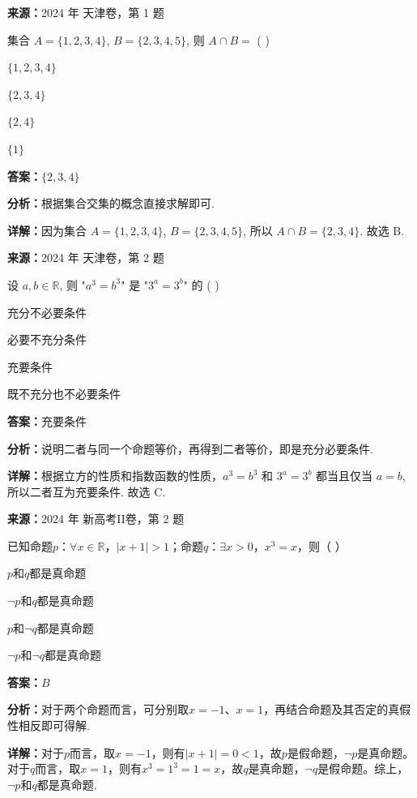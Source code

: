 \begin{question}[points=5]
\textbf{来源：}2024 年 天津卷，第 1 题\par
集合 $A = \{1,2,3,4\}$, $B = \{2,3,4,5\}$, 则 $A \cap B =$ ( )
\begin{choices}
  \item $\{1,2,3,4\}$
  \item $\{2,3,4\}$
  \item $\{2,4\}$
  \item $\{1\}$
\end{choices}
\begin{solution}
\textbf{答案：}$\{2,3,4\}$

\textbf{分析：}根据集合交集的概念直接求解即可.

\textbf{详解：}因为集合 $A = \{1,2,3,4\}$, $B = \{2,3,4,5\}$, 所以 $A \cap B = \{2,3,4\}$. 故选 B.
\end{solution}
\end{question}

\begin{question}[points=5]
\textbf{来源：}2024 年 天津卷，第 2 题\par
设 $a,b \in \mathbb{R}$, 则 "$a^3 = b^3$" 是 "$3^a = 3^b$" 的 ( )
\begin{choices}
  \item 充分不必要条件
  \item 必要不充分条件
  \item 充要条件
  \item 既不充分也不必要条件
\end{choices}
\begin{solution}
\textbf{答案：}充要条件

\textbf{分析：}说明二者与同一个命题等价，再得到二者等价，即是充分必要条件.

\textbf{详解：}根据立方的性质和指数函数的性质，$a^3 = b^3$ 和 $3^a = 3^b$ 都当且仅当 $a = b$, 所以二者互为充要条件. 故选 C.
\end{solution}
\end{question}

\begin{question}[points=5]
\textbf{来源：}2024 年 新高考II卷，第 2 题\par
已知命题$p$：$\forall x \in \mathbb{R}$，$|x+1| > 1$；命题$q$：$\exists x > 0$，$x^3 = x$，则（ ）
\begin{choices}
  \item $p$和$q$都是真命题
  \item $\neg p$和$q$都是真命题
  \item $p$和$\neg q$都是真命题
  \item $\neg p$和$\neg q$都是真命题
\end{choices}
\begin{solution}
\textbf{答案：}$B$

\textbf{分析：}对于两个命题而言，可分别取$x=-1$、$x=1$，再结合命题及其否定的真假性相反即可得解.

\textbf{详解：}对于$p$而言，取$x=-1$，则有$|x+1|=0 < 1$，故$p$是假命题，$\neg p$是真命题。对于$q$而言，取$x=1$，则有$x^3=1^3=1=x$，故$q$是真命题，$\neg q$是假命题。综上，$\neg p$和$q$都是真命题.
\end{solution}
\end{question}

